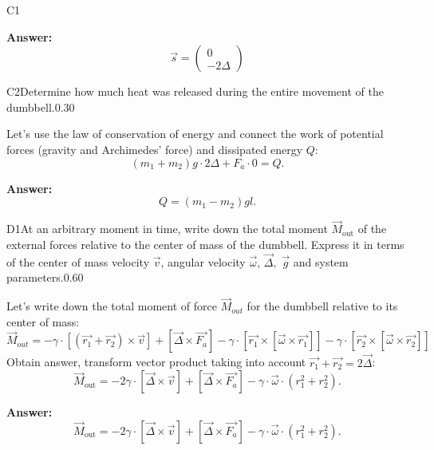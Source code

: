 \documentclass[11pt,a4paper]{article}
\begin{document}
\begin{solcard}{C1}
\par\smallskip\noindent\textbf{Answer:} $$ \vec{s} = \begin{pmatrix} 0\\ -2\Delta \end{pmatrix} $$
\end{solcard}

\begin{solcard}{C2}{Determine how much heat was released during the entire movement of the dumbbell.}{0.30}

Let's use the law of conservation of energy and connect the work of potential forces (gravity and Archimedes' force) and dissipated energy $Q$: $$(m_1 + m_2)g\cdot 2\Delta + F_a \cdot 0 = Q.$$

\par\smallskip\noindent\textbf{Answer:} $$Q = (m_1 - m_2)gl.$$
\end{solcard}

\begin{solcard}{D1}{At an arbitrary moment in time, write down the total moment $\vec{M}_{\text{out}}$ of the external forces relative to the center of mass of the dumbbell. Express it in terms of the center of mass velocity $\vec{v}$, angular velocity $\vec{\omega}$, $\vec{\Delta},$ $\vec{g}$ and system parameters.}{0.60}

Let's write down the total moment of force $\vec{M}_{out}$ for the dumbbell relative to its center of mass: $$\vec{M}_{out} = -\gamma \cdot [(\vec{r_1}+\vec{r_2}) \times \vec{v}] + [\vec{\Delta} \times \vec{F_a}] - \gamma \cdot [\vec{r_1} \times [\vec{\omega} \times \vec{r_1}]] - \gamma \cdot \left[ \vec{r_2} \times [\vec{\omega} \times \vec{r_2}] \right] $$Obtain answer, transform vector product taking into account $\vec{r_1}+\vec{r_2} = 2 \vec{\Delta}$: $$\vec{M}_{\text{out}} = -2 \gamma \cdot [\vec{\Delta} \times \vec{v}] + [\vec{\Delta} \times \vec{F_a}] - \gamma \cdot \vec{\omega} \cdot \left( r_1^2+r_2^2 \right) .$$

\par\smallskip\noindent\textbf{Answer:} $$\vec{M}_{\text{out}} = -2 \gamma \cdot [\vec{\Delta} \times \vec{v}] + [\vec{\Delta} \times \vec{F_a}] - \gamma \cdot \vec{\omega} \cdot \left( r_1^2+r_2^2 \right) .$$
\end{solcard}
\end{document}
